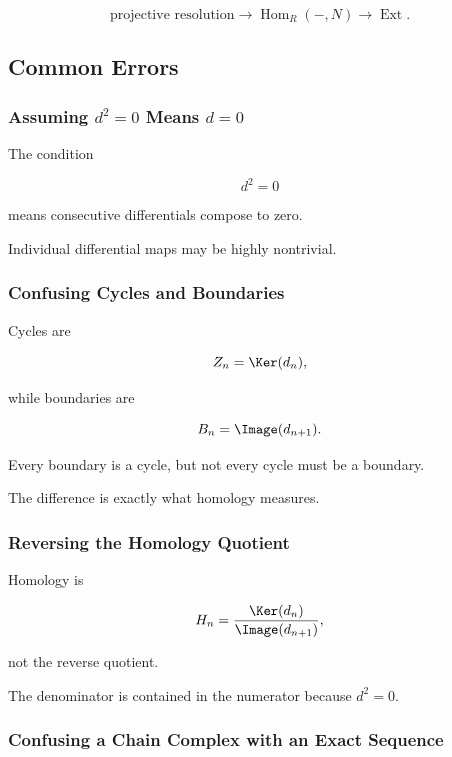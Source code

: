 \[ \text{projective resolution}
\longrightarrow
\operatorname{Hom}_R(-,N)
\longrightarrow
\operatorname{Ext}. \]

\subsection{Common Errors}
\label{subsec:homological-algebra-common-errors}

\subsubsection{Assuming \(d^2=0\) Means \(d=0\)}

The condition

\[ d^2=0 \]

means consecutive differentials compose to zero.

Individual differential maps may be highly nontrivial.

\subsubsection{Confusing Cycles and Boundaries}

Cycles are

\[ Z_n=\Ker(d_n), \]

while boundaries are

\[ B_n=\Image(d_{n+1}). \]

Every boundary is a cycle, but not every cycle must be a boundary.

The difference is exactly what homology measures.

\subsubsection{Reversing the Homology Quotient}

Homology is

\[ H_n=\frac{\Ker(d_n)}{\Image(d_{n+1})}, \]

not the reverse quotient.

The denominator is contained in the numerator because \(d^2=0\).

\subsubsection{Confusing a Chain Complex with an Exact Sequence}

